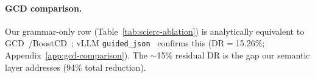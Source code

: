 \paragraph{GCD comparison.}
\label{sec:constrained-baselines}
Our grammar-only row (Table~\ref{tab:scierc-ablation}) is analytically equivalent to GCD~\cite{geng2023gcd}/BoostCD~\cite{boostcd2025}; vLLM \texttt{guided\_json}~\cite{kwon2023vllm} confirms this (DR${=}$15.26\%; Appendix~\ref{app:gcd-comparison}).
The ${\sim}$15\% residual DR is the gap our semantic layer addresses (94\% total reduction).
